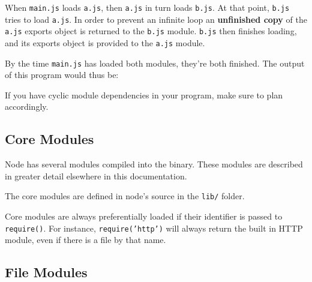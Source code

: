 When \texttt{main.js} loads \texttt{a.js}, then \texttt{a.js} in turn
loads \texttt{b.js}. At that point, \texttt{b.js} tries to load
\texttt{a.js}. In order to prevent an infinite loop an
\textbf{unfinished copy} of the \texttt{a.js} exports object is returned
to the \texttt{b.js} module. \texttt{b.js} then finishes loading, and
its exports object is provided to the \texttt{a.js} module.

By the time \texttt{main.js} has loaded both modules, they're both
finished. The output of this program would thus be:

\begin{Shaded}
\begin{Highlighting}[]
 
  \NormalTok{= }
  \NormalTok{= }
 \NormalTok{=}\NormalTok{, }\NormalTok{=}
\end{Highlighting}
\end{Shaded}

If you have cyclic module dependencies in your program, make sure to
plan accordingly.

\subsection{Core Modules}

Node has several modules compiled into the binary. These modules are
described in greater detail elsewhere in this documentation.

The core modules are defined in node's source in the \texttt{lib/}
folder.

Core modules are always preferentially loaded if their identifier is
passed to \texttt{require()}. For instance, \texttt{require('http')}
will always return the built in HTTP module, even if there is a file by
that name.

\subsection{File Modules}

